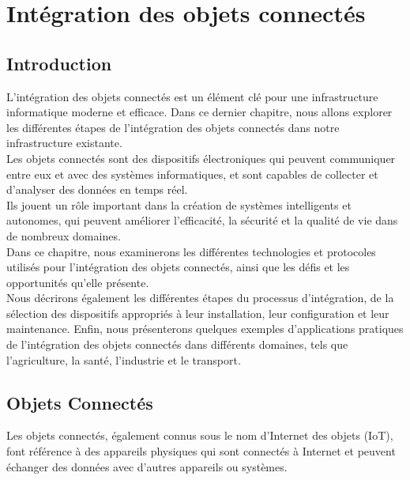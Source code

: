 \chapter{Intégration des objets connectés}

\section{Introduction}

L'intégration des objets connectés est un élément clé pour une infrastructure informatique moderne et efficace. Dans ce dernier chapitre, nous allons explorer les différentes étapes de l'intégration des objets connectés dans notre infrastructure existante. \\

Les objets connectés sont des dispositifs électroniques qui peuvent communiquer entre eux et avec des systèmes informatiques, et sont capables de collecter et d'analyser des données en temps réel. \\

Ils jouent un rôle important dans la création de systèmes intelligents et autonomes, qui peuvent améliorer l'efficacité, la sécurité et la qualité de vie dans de nombreux domaines. \\

Dans ce chapitre, nous examinerons les différentes technologies et protocoles utilisés pour l'intégration des objets connectés, ainsi que les défis et les opportunités qu'elle présente. \\

Nous décrirons également les différentes étapes du processus d'intégration, de la sélection des dispositifs appropriés à leur installation, leur configuration et leur maintenance. Enfin, nous présenterons quelques exemples d'applications pratiques de l'intégration des objets connectés dans différents domaines, tels que l'agriculture, la santé, l'industrie et le transport. \\







\section{Objets Connectés}

Les objets connectés, également connus sous le nom d'Internet des objets (IoT), font référence à des appareils physiques qui sont connectés à Internet et peuvent échanger des données avec d'autres appareils ou systèmes. \\

